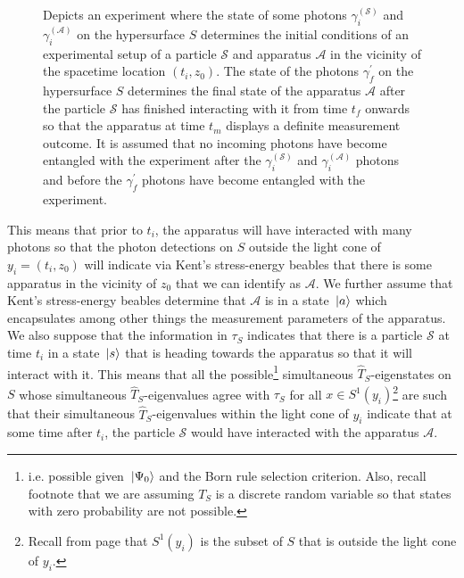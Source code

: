 \begin{figure}[ht!]
	\vspace*{2px}
	\caption[Toy model where photon detection determines measurement choice]{Depicts an experiment where the state of some photons $\gamma_i^{(\mathcal{S})}$ and $\gamma_i^{(\mathcal{A})}$ on the hypersurface $S$ determines the initial conditions of an experimental setup of a particle $\mathcal{S}$ and apparatus $\mathcal{A}$ in the vicinity of the spacetime location $( t_i, z_0)$.  The state of the photons $\gamma_f^{\prime}$ on the hypersurface $S$ determines the final state of the apparatus $\mathcal{A}$ after the particle $ \mathcal{S}$ has finished interacting with it from time $t_f$ onwards so that the apparatus at time $t_m$	displays a definite measurement outcome. It is assumed that no incoming photons have become entangled with the experiment after the $\gamma_i^{(\mathcal{S})}$ and $\gamma_i^{(\mathcal{A})}$ photons and before the $\gamma_f^{\prime}$ photons have become entangled with the experiment.  }
	\label{pisolution}
	\end{figure}
This means that prior to $t_i$, the apparatus will have interacted with many photons so that the photon detections on $S$ outside the light cone of $y_i=(t_i, z_0)$ %
%
 will indicate via Kent's stress-energy beables that there is some apparatus in the vicinity of $z_0$ that we can identify as $\mathcal{A}$. We further assume that Kent's stress-energy beables determine that $\mathcal{A}$ is in a state $\ket*{a}$ %
%
which encapsulates among other things the measurement parameters of the apparatus.  We also suppose that the information in $\tau_S$ indicates that there is a particle $\mathcal{S}$ at time $t_i$ in a state
$\ket*{s}$ %
%
 that is heading towards the apparatus so that it will interact with it. This means that all the 
possible\footnote{i.e. possible given $\ket*{\Psi_0}$ and the Born rule selection criterion. Also, recall footnote  that we are assuming $T_S$ is a discrete random variable so that states with zero probability are not possible.} 
simultaneous $\hat{T}_S$-eigenstates on $S$ whose simultaneous $\hat{T}_S$-eigenvalues agree with $\tau_S$ for all $x\in S^1(y_i)$\footnote{Recall from page \pageref{S2} that $S^1(y_i)$ is the subset of $S$ that is outside the light cone of $y_i$.} 
 are such that their simultaneous $\hat{T}_S$-eigenvalues within the light cone of $y_i$ indicate that at some time after $t_i$, the particle $\mathcal{S}$ would have interacted
with the apparatus $\mathcal{A}$. 

